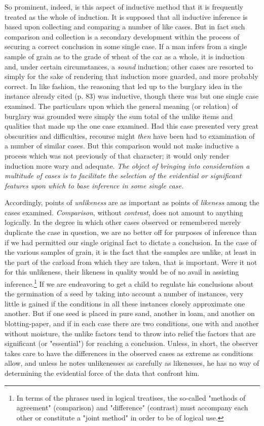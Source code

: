 \documentclass[letterpaper]{book}
\begin{document}
So prominent, indeed, is this aspect of inductive method that it is
frequently treated as the whole of induction. It is supposed that all
inductive inference is based upon collecting and comparing a number of
like cases. But in fact such comparison and collection is
a
secondary development within the process of securing a correct
conclusion in some single case. If a man infers from a single sample of
grain as to the grade of wheat of the car as a whole, it is induction
and, under certain circumstances, a \emph{sound} induction; other cases
are resorted to simply for the sake of rendering that induction more
guarded, and more probably correct. In like fashion, the reasoning that
led up to the burglary idea in the instance already cited (p. 83) was
inductive, though there was but one single case examined. The
particulars upon which the general meaning (or relation) of burglary was
grounded were simply the sum total of the unlike items and qualities
that made up the one case examined. Had this case presented very great
obscurities and difficulties, recourse might \emph{then} have been had
to examination of a number of similar cases. But this comparison would
not make inductive a process which was not previously of that character;
it would only render induction more wary and adequate. \emph{The object
of bringing into consideration a multitude of cases is to facilitate the
selection of the evidential or significant features upon which to base
inference in some single case.}


Accordingly, points of \emph{unlikeness} are as important as points of
\emph{likeness} among the cases examined. \emph{Comparison}, without
\emph{contrast}, does not amount to anything logically. In the degree in
which other cases observed or remembered merely duplicate the case in
question, we are no better off for purposes of inference than if we had
permitted our single original fact to dictate a conclusion. In the case
of the various samples of grain, it is the fact that the samples are
unlike, at least in the part of the carload from which they are taken,
that is important. Were it not for this unlikeness, their
likeness
in quality would be of no avail in assisting
inference.\footnote{
In terms of the phrases used in logical treatises, the so-called
"methods of agreement" (comparison) and "difference" (contrast) must
accompany each other or constitute a "joint method" in order to be of
logical use.
}
If we are endeavoring to get a child to regulate his conclusions about
the germination of a seed by taking into account a number of instances,
very little is gained if the conditions in all these instances closely
approximate one another. But if one seed is placed in pure sand, another
in loam, and another on blotting-paper, and if in each case there are
two conditions, one with and another without moisture, the unlike
factors tend to throw into relief the factors that are significant (or
"essential") for reaching a conclusion. Unless, in short, the observer
takes care to have the differences in the observed cases as extreme as
conditions allow, and unless he notes unlikenesses as carefully as
likenesses, he has no way of determining the evidential force of the
data that confront him.
\end{document}
